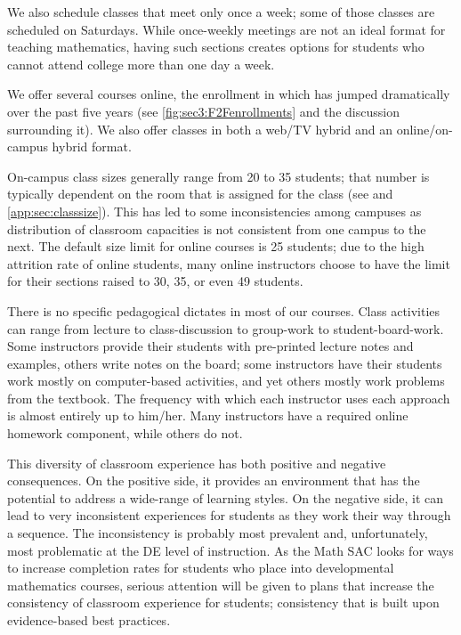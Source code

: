 We also schedule classes that meet only once a week; some of those classes are
scheduled on  Saturdays.   While once-weekly meetings are not an ideal format for
teaching mathematics, having such sections creates options for students who
cannot attend college more than one day a week.  

We offer several courses online, the enrollment in which has jumped
dramatically over the past five years (see \vref{fig:sec3:F2Fenrollments} and the discussion
surrounding it).  We also offer classes in both a web/TV hybrid and an online/on-campus hybrid format.

On-campus class sizes generally range from 20 to 35 students; that number is
typically dependent on the room that is assigned for the class (see  and 
\vref{app:sec:classsize}).  This has led
to some inconsistencies among campuses as distribution of classroom capacities
is not consistent from one campus to the next.   
The default size limit for online courses is 25 students; due to the high
attrition rate of online students, many online instructors choose to have
the limit for their sections raised to 30, 35, or even 49 students.

There is no specific pedagogical dictates in most of our courses.  Class
activities can range from lecture to class-discussion to group-work to
student-board-work. Some instructors provide their students with pre-printed
lecture notes and examples, others write notes on the board; some instructors
have their students work mostly on computer-based activities, and yet others
mostly work problems from the textbook. The frequency with which each
instructor uses each approach is almost entirely up to him/her.  Many
instructors have a required online homework component, while others do not.

This diversity of classroom experience has both positive and negative
consequences.  On the positive side, it provides an environment that has the
potential to address a wide-range of learning styles.  On the negative side, it
can lead to very inconsistent experiences for students as they work their way
through a sequence.  The inconsistency is probably most prevalent and,
unfortunately, most  problematic at the DE level of instruction.  
As the Math SAC looks for ways to increase completion rates for students who
place into developmental mathematics courses, serious attention will be given
to plans that increase the consistency of classroom experience for students;
consistency that is built upon evidence-based best practices.

